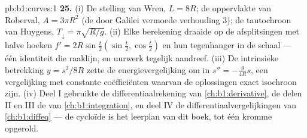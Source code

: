 \begin{solution}{pb:b1:curves:1}
\textbf{25.} (i) De stelling van Wren, $L = 8R$; de oppervlakte van
Roberval, $A = 3\pi R^2$ (de door Galilei vermoede verhouding $3$);
de tautochroon van Huygens, $T_\downarrow = \pi\sqrt{R/g}$. (ii)
Elke berekening draaide op de afsplitsingen met halve hoeken $f' =
2R\sin\frac t2(\sin\frac t2, \cos\frac t2)$ en hun tegenhanger in
de schaal --- één identiteit die raaklijn,  en uurwerk
tegelijk aandreef. (iii) De intrinsieke betrekking $y = s^2/8R$
zette de energievergelijking om in $s'' = -\frac{g}{4R}s$, een
 vergelijking met constante coëfficiënten waarvan de
oplossingen exact isochroon zijn. (iv) Deel I gebruikte de
differentiaalrekening van \cref{ch:b1:derivative}, de delen II en
III de  van \cref{ch:b1:integration}, en deel IV de
differentiaalvergelijkingen van \cref{ch:b1:diffeq} --- de cycloïde
is het leerplan van dit boek, tot één kromme opgerold.
\end{solution}
